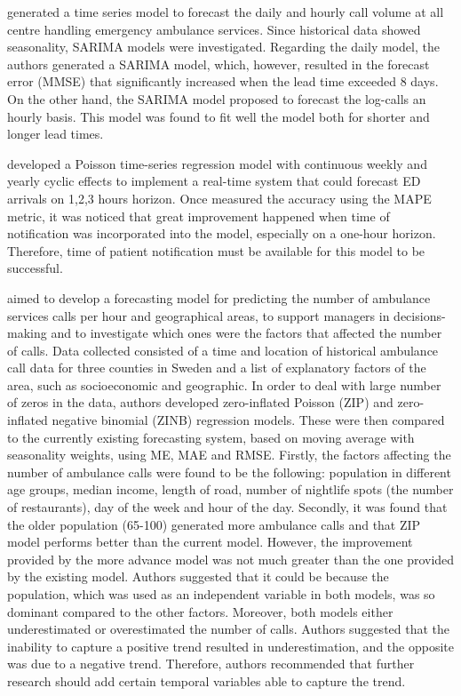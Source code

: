 \documentclass[]{elsarticle} %
\begin{document}
\citet{gijo2016sarima} generated a time series model to forecast the daily and hourly call volume at all centre handling emergency ambulance services. Since historical data showed seasonality, SARIMA models were investigated. Regarding the daily model, the authors generated a SARIMA model, which, however, resulted in the forecast error (MMSE) that significantly increased when the lead time exceeded 8 days. On the other hand, the SARIMA model proposed to forecast the log-calls an hourly basis. This model was found to fit well the model both for shorter and longer lead times.

\citet{asheim2019real} developed a Poisson time-series regression model with continuous weekly and yearly cyclic effects to implement a real-time system that could forecast ED arrivals on 1,2,3 hours horizon. Once measured the accuracy using the MAPE metric, it was noticed that great improvement happened when time of notification was incorporated into the model, especially on a one-hour horizon. Therefore, time of patient notification must be available for this model to be successful.

\citet{steins2019forecasting} aimed to develop a forecasting model for predicting the number of ambulance services calls per hour and geographical areas, to support managers in decisions-making and to investigate which ones were the factors that affected the number of calls. Data collected consisted of a time and location of historical ambulance call data for three counties in Sweden and a list of explanatory factors of the area, such as socioeconomic and geographic. In order to deal with large number of zeros in the data, authors developed zero-inflated Poisson (ZIP) and zero-inflated negative binomial (ZINB) regression models. These were then compared to the currently existing forecasting system, based on moving average with seasonality weights, using ME, MAE and RMSE. Firstly, the factors affecting the number of ambulance calls were found to be the following: population in different age groups, median income, length of road, number of nightlife spots (the number of restaurants), day of the week and hour of the day. Secondly, it was found that the older population (65-100) generated more ambulance calls and that ZIP model performs better than the current model. However, the improvement provided by the more advance model was not much greater than the one provided by the existing model. Authors suggested that it could be because the population, which was used as an independent variable in both models, was so dominant compared to the other factors.
Moreover, both models either underestimated or overestimated the number of calls. Authors suggested that the inability to capture a positive trend resulted in underestimation, and the opposite was due to a negative trend. Therefore, authors recommended that further research should add certain temporal variables able to capture the trend.
\end{document}
